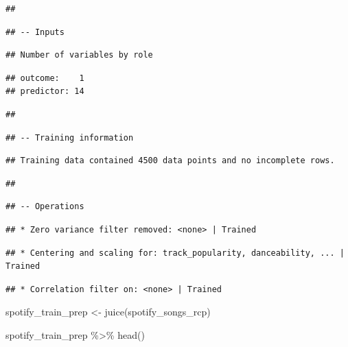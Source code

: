 \documentclass[
]{article}
\newenvironment{Shaded}{\begin{snugshade}}{\end{snugshade}}
\newcommand{\FunctionTok}[1]{\textcolor[rgb]{0.00,0.00,0.00}{#1}}
\newcommand{\NormalTok}[1]{#1}
\newcommand{\OtherTok}[1]{\textcolor[rgb]{0.56,0.35,0.01}{#1}}
\newcommand{\SpecialCharTok}[1]{\textcolor[rgb]{0.00,0.00,0.00}{#1}}
\begin{document}
\begin{verbatim}
## 
\end{verbatim}

\begin{verbatim}
## -- Inputs
\end{verbatim}

\begin{verbatim}
## Number of variables by role
\end{verbatim}

\begin{verbatim}
## outcome:    1
## predictor: 14
\end{verbatim}

\begin{verbatim}
## 
\end{verbatim}

\begin{verbatim}
## -- Training information
\end{verbatim}

\begin{verbatim}
## Training data contained 4500 data points and no incomplete rows.
\end{verbatim}

\begin{verbatim}
## 
\end{verbatim}

\begin{verbatim}
## -- Operations
\end{verbatim}

\begin{verbatim}
## * Zero variance filter removed: <none> | Trained
\end{verbatim}

\begin{verbatim}
## * Centering and scaling for: track_popularity, danceability, ... | Trained
\end{verbatim}

\begin{verbatim}
## * Correlation filter on: <none> | Trained
\end{verbatim}

\begin{Shaded}
\begin{Highlighting}[]
\NormalTok{spotify\_train\_prep }\OtherTok{\textless{}{-}} \FunctionTok{juice}\NormalTok{(spotify\_songs\_rcp)}

\NormalTok{spotify\_train\_prep }\SpecialCharTok{\%\textgreater{}\%} \FunctionTok{head}\NormalTok{()}
\end{Highlighting}
\end{Shaded}
\end{document}
